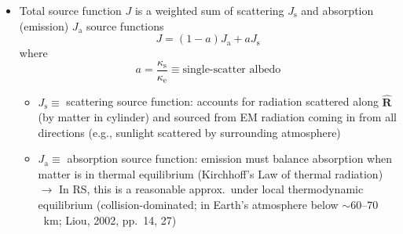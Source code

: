 \documentclass[11pt, oneside]{article}
\newcommand{\ke}{\kappa_\mathrm{e}}
\newcommand{\ks}{\kappa_\mathrm{s}}
\newcommand{\Rh}{\hat{\mathbf{R}}}
\begin{document}
\begin{itemize}
	\item Total source function $J$ is a weighted sum of scattering $J_\mathrm{s}$ and absorption (emission) $J_\mathrm{a}$ source functions
	\begin{equation}
		\label{e:J}
		J = (1 - a)J_\mathrm{a} + aJ_\mathrm{s}
	\end{equation}
	where
	\begin{equation*}
		a = \frac{\ks}{\ke} \equiv \text{single-scatter albedo}
	\end{equation*}
	\begin{itemize}
		\item[] $J_\mathrm{s} \equiv$ scattering source function: accounts for radiation scattered along $\Rh$ (by matter in cylinder) and sourced from EM radiation coming in from all directions (e.g., sunlight scattered by surrounding atmosphere)
		\item[] $J_\mathrm{a} \equiv$ absorption source function: emission must balance absorption when matter is in thermal equilibrium (Kirchhoff's Law of thermal radiation) $\rightarrow$ In RS, this is a reasonable approx.\ under local thermodynamic equilibrium (collision-dominated; in Earth's atmosphere below ${\sim}60$--$70$~km; Liou, 2002, pp.~14, 27)
	\end{itemize}
\end{itemize}
\end{document}
